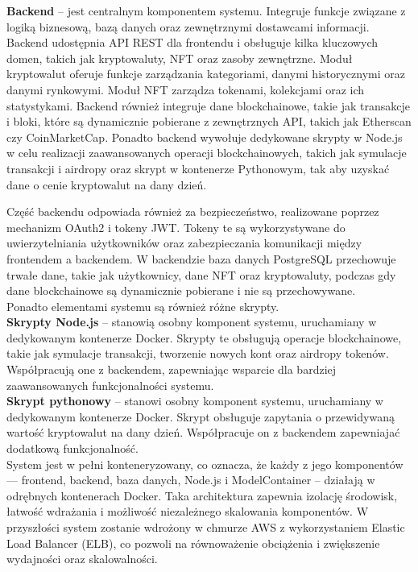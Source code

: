 \noindent \textbf{Backend} -- %
jest centralnym komponentem systemu. Integruje funkcje związane z logiką biznesową, bazą danych oraz zewnętrznymi dostawcami informacji. Backend udostępnia API REST dla frontendu i obsługuje kilka kluczowych domen, takich jak kryptowaluty, NFT oraz zasoby zewnętrzne. Moduł kryptowalut oferuje funkcje zarządzania kategoriami, danymi historycznymi oraz danymi rynkowymi. Moduł NFT zarządza tokenami, kolekcjami oraz ich statystykami. Backend również integruje dane blockchainowe, takie jak transakcje i bloki, które są dynamicznie pobierane z zewnętrznych API, takich jak Etherscan czy CoinMarketCap. Ponadto backend wywołuje dedykowane skrypty w Node.js w celu realizacji zaawansowanych operacji blockchainowych, takich jak symulacje transakcji i airdropy oraz skrypt w kontenerze Pythonowym, tak aby uzyskać dane o cenie kryptowalut na dany dzień.

Część backendu odpowiada również za bezpieczeństwo, realizowane poprzez mechanizm OAuth2 i tokeny JWT. Tokeny te są wykorzystywane do uwierzytelniania użytkowników oraz zabezpieczania komunikacji między frontendem a backendem. W backendzie baza danych PostgreSQL przechowuje trwałe dane, takie jak użytkownicy, dane NFT oraz kryptowaluty, podczas gdy dane blockchainowe są dynamicznie pobierane i nie są przechowywane.\\[-10pt]

\noindent Ponadto elementami systemu są również różne skrypty. \\[-10pt]

\noindent \textbf{Skrypty Node.js} -- stanowią osobny komponent systemu, uruchamiany w dedykowanym kontenerze Docker. Skrypty te obsługują operacje blockchainowe, takie jak symulacje transakcji, tworzenie nowych kont oraz airdropy tokenów. Współpracują one z backendem, zapewniając wsparcie dla bardziej zaawansowanych funkcjonalności systemu.\\[-10pt]

\noindent \textbf{Skrypt pythonowy} -- stanowi osobny komponent systemu, uruchamiany w dedykowanym kontenerze Docker. Skrypt obsługuje zapytania o przewidywaną wartość kryptowalut na dany dzień. Współpracuje on z backendem zapewniajać dodatkową funkcjonalność.\\[-10pt]

System jest w pełni konteneryzowany, co oznacza, że każdy z jego komponentów — frontend, backend, baza danych, Node.js i ModelContainer -- działają w odrębnych kontenerach Docker. Taka architektura zapewnia izolację środowisk, łatwość wdrażania i możliwość niezależnego skalowania komponentów. W przyszłości system zostanie wdrożony w chmurze AWS z wykorzystaniem Elastic Load Balancer (ELB), co pozwoli na równoważenie obciążenia i zwiększenie wydajności oraz skalowalności.

